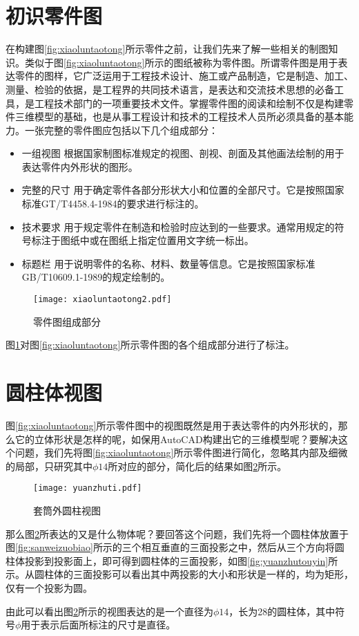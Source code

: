 \section{初识零件图}
在构建图\ref{fig:xiaoluntaotong}所示零件之前，让我们先来了解一些相关的制图知识。类似于图\ref{fig:xiaoluntaotong}所示的图纸被称为零件图。所谓零件图是用于表达零件的图样，它广泛运用于工程技术设计、施工或产品制造，它是制造、加工、测量、检验的依据，是工程界的共同技术语言，是表达和交流技术思想的必备工具，是工程技术部门的一项重要技术文件。掌握零件图的阅读和绘制不仅是构建零件三维模型的基础，也是从事工程设计和技术的工程技术人员所必须具备的基本能力。一张完整的零件图应包括以下几个组成部分：
\begin{itemize}
\item 一组视图
根据国家制图标准规定的视图、剖视、剖面及其他画法绘制的用于表达零件内外形状的图形。
\item 完整的尺寸
用于确定零件各部分形状大小和位置的全部尺寸。它是按照国家标准GT/T4458.4-1984的要求进行标注的。
\item 技术要求
用于规定零件在制造和检验时应达到的一些要求。通常用规定的符号标注于图纸中或在图纸上指定位置用文字统一标出。
\item 标题栏
用于说明零件的名称、材料、数量等信息。它是按照国家标准GB/T10609.1-1989的规定绘制的。
\end{itemize}
\begin{figure}[htbp]
\centering
\texttt{[image: xiaoluntaotong2.pdf]}
\caption{零件图组成部分}\label{fig:xiaoluntaotong2}
\end{figure}
图\ref{fig:xiaoluntaotong2}对图\ref{fig:xiaoluntaotong}所示零件图的各个组成部分进行了标注。
\section{圆柱体视图}
图\ref{fig:xiaoluntaotong}所示零件图中的视图既然是用于表达零件的内外形状的，那么它的立体形状是怎样的呢，如保用AutoCAD构建出它的三维模型呢？要解决这个问题，我们先将图\ref{fig:xiaoluntaotong}所示零件图进行简化，忽略其内部及细微的局部，只研究其中$\phi 14$所对应的部分，简化后的结果如图\ref{fig:yuanzhuti}所示。
\begin{figure}[htbp]
\centering
\texttt{[image: yuanzhuti.pdf]}
\caption{套筒外圆柱视图}\label{fig:yuanzhuti}
\end{figure}

那么图\ref{fig:yuanzhuti}所表达的又是什么物体呢？要回答这个问题，我们先将一个圆柱体放置于图\ref{fig:sanweizuobiao}所示的三个相互垂直的三面投影之中，然后从三个方向将圆柱体投影到投影面上，即可得到圆柱体的三面投影，如图\ref{fig:yuanzhutouyin}所示。从圆柱体的三面投影可以看出其中两投影的大小和形状是一样的，均为矩形，仅有一个投影为圆。
\begin{figure}[htbp]
\centering
{}\hspace{30pt}
\end{figure}

由此可以看出图\ref{fig:yuanzhuti}所示的视图表达的是一个直径为$\phi 14$，长为28的圆柱体，其中符号$\phi$用于表示后面所标注的尺寸是直径。

\endinput